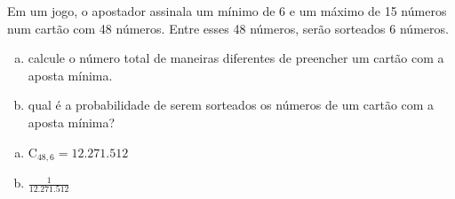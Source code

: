 \begin{ex}
Em um jogo, o apostador assinala um mínimo de 6 e um máximo de 15 números num cartão com 48 números. Entre esses 48 números, serão sorteados 6 números.
   \begin{enumerate}[(a)]
   \item calcule o número total de maneiras diferentes de preencher um cartão com a aposta mínima.
   \item qual é a probabilidade de serem sorteados os números de um cartão com a aposta mínima?
   \end{enumerate}
     \begin{sol}
      \phantom{A}
      \begin{enumerate} [(a)]
          \item $\mathrm{C}_{{48},6}=12.271.512$
          \item $\frac{1}{12.271.512}$
      \end{enumerate}
     \end{sol}
\end{ex}